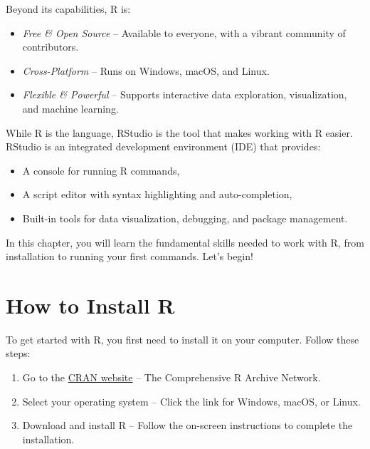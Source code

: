 \documentclass[
]{book}
\providecommand{\tightlist}{%
  \setlength{\itemsep}{0pt}\setlength{\parskip}{0pt}}
\theoremstyle{definition}
\theoremstyle{definition}
\theoremstyle{definition}
\theoremstyle{definition}
\theoremstyle{remark}
\begin{document}
Beyond its capabilities, R is:

\begin{itemize}
\tightlist
\item
  \emph{Free \& Open Source} -- Available to everyone, with a vibrant community of contributors.
\item
  \emph{Cross-Platform} -- Runs on Windows, macOS, and Linux.
\item
  \emph{Flexible \& Powerful} -- Supports interactive data exploration, visualization, and machine learning.
\end{itemize}

While R is the language, RStudio is the tool that makes working with R easier. RStudio is an integrated development environment (IDE) that provides:

\begin{itemize}
\tightlist
\item
  A console for running R commands,\\
\item
  A script editor with syntax highlighting and auto-completion,\\
\item
  Built-in tools for data visualization, debugging, and package management.
\end{itemize}

In this chapter, you will learn the fundamental skills needed to work with R, from installation to running your first commands. Let's begin! 🚀

\section{How to Install R}\label{how-to-install-r}

To get started with R, you first need to install it on your computer. Follow these steps:

\begin{enumerate}
\def\labelenumi{\arabic{enumi}.}
\tightlist
\item
  Go to the \href{https://cran.r-project.org}{CRAN website} -- The Comprehensive R Archive Network.\\
\item
  Select your operating system -- Click the link for Windows, macOS, or Linux.\\
\item
  Download and install R -- Follow the on-screen instructions to complete the installation.
\end{enumerate}
\end{document}
